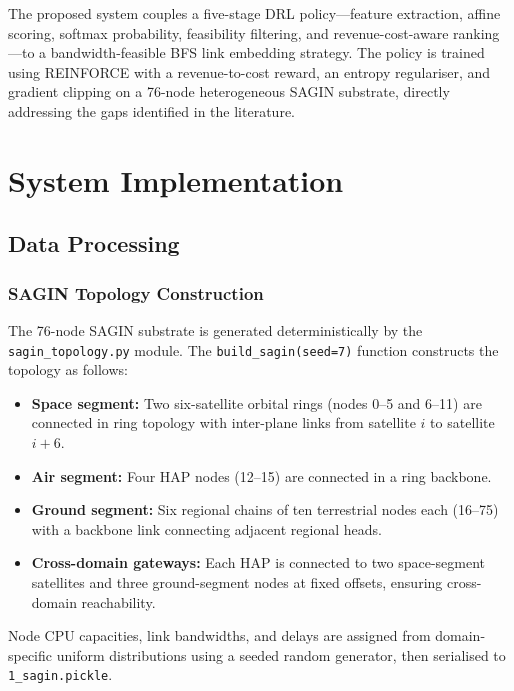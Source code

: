 \documentclass[12pt,a4paper]{report}
\begin{document}
The proposed system couples a five-stage DRL policy---feature extraction, affine scoring,
softmax probability, feasibility filtering, and revenue-cost-aware ranking---to a
bandwidth-feasible BFS link embedding strategy. The policy is trained using REINFORCE with a
revenue-to-cost reward, an entropy regulariser, and gradient clipping on a 76-node
heterogeneous SAGIN substrate, directly addressing the gaps identified in the literature.

\chapter{System Implementation}
\label{ch:implementation}

\section{Data Processing}
\label{sec:data-processing}

\subsection{SAGIN Topology Construction}

The 76-node SAGIN substrate is generated deterministically by the \texttt{sagin\_topology.py}
module. The \texttt{build\_sagin(seed=7)} function constructs the topology as follows:

\begin{itemize}[leftmargin=*]
  \item \textbf{Space segment:} Two six-satellite orbital rings (nodes 0--5 and 6--11) are
        connected in ring topology with inter-plane links from satellite $i$ to satellite
        $i+6$.
  \item \textbf{Air segment:} Four HAP nodes (12--15) are connected in a ring backbone.
  \item \textbf{Ground segment:} Six regional chains of ten terrestrial nodes each (16--75)
        with a backbone link connecting adjacent regional heads.
  \item \textbf{Cross-domain gateways:} Each HAP is connected to two space-segment satellites
        and three ground-segment nodes at fixed offsets, ensuring cross-domain reachability.
\end{itemize}

Node CPU capacities, link bandwidths, and delays are assigned from domain-specific uniform
distributions using a seeded random generator, then serialised to \texttt{1\_sagin.pickle}.
\end{document}
